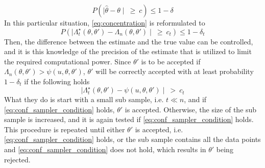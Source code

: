 \documentclass{article}
\theoremstyle{definition}
\begin{document}
\begin{equation}\label{eq:concentration}
    P\left(\mid \hat{\theta} - \theta \mid \:\geq \:c\right) \leq 1 - \delta 
\end{equation}
In this particular situation, \eqref{eq:concentration} is reformulated to 
\begin{equation*}
    P\left(\mid\Lambda_t^{\star}\left(\theta, \theta'\right) - \Lambda_n\left(\theta, \theta'\right)\mid \: \geq \:c_t \right) \leq 1 - \delta_t  
\end{equation*}{}
Then, the difference between the estimate and the true value can be controlled, and it is this knowledge of the precision of the estimate that is utilized to limit the required computational power.
Since $\theta'$ is to be accepted if $\Lambda_n\left(\theta, \theta'\right) > \psi\left(u, \theta, \theta'\right)$,  $\theta'$ will be correctly accepted with at least probability $1 - \delta_t$ if  the following holds 
\begin{equation}\label{eq:conf_sampler_condition}
    \mid\Lambda_t^{\star}\left(\theta, \theta'\right) - \psi\left(u, \theta, \theta'\right)\mid \:>\: c_t
\end{equation} What they do is start with a small sub sample, i.e. $t \ll n$, and if \eqref{eq:conf_sampler_condition} holds, $\theta'$ is accepted. Otherwise, the size of the sub sample is increased, and it is again tested if \eqref{eq:conf_sampler_condition} holds. This procedure is repeated until either $\theta'$ is accepted, i.e. \eqref{eq:conf_sampler_condition} holds, or the sub sample contains all the data points and \eqref{eq:conf_sampler_condition} does not hold, which results in $\theta'$ being rejected. 
\end{document}
